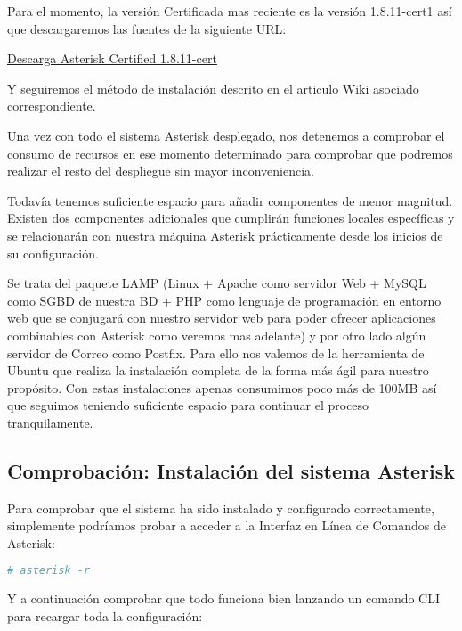Para el momento, la versión Certificada mas reciente es la versión 1.8.11-cert1 así que descargaremos las fuentes de la siguiente URL:

\href{http://downloads.asterisk.org/pub/telephony/certified-asterisk/releases/certified-asterisk-1.8.11-cert1.tar.gz}{Descarga Asterisk Certified 1.8.11-cert}

Y seguiremos el método de instalación descrito en el articulo Wiki asociado correspondiente.

Una vez con todo el sistema Asterisk desplegado, nos detenemos a comprobar el consumo de recursos en ese momento determinado para comprobar que podremos realizar el resto del despliegue sin mayor inconveniencia.


Todavía tenemos suficiente espacio para añadir componentes de menor magnitud. Existen dos componentes adicionales que cumplirán funciones locales específicas y se relacionarán con nuestra máquina Asterisk prácticamente desde los inicios de su configuración. 

Se trata del paquete LAMP (Linux + Apache como servidor Web + MySQL como SGBD de nuestra BD + PHP como lenguaje de programación en entorno web que se conjugará con nuestro servidor web para poder ofrecer aplicaciones combinables con Asterisk como veremos mas adelante) y por otro lado algún servidor de Correo como Postfix. Para ello nos valemos de la herramienta  de Ubuntu que realiza la instalación completa de la forma más ágil para nuestro propósito. Con estas instalaciones apenas consumimos poco más de 100MB así que seguimos teniendo suficiente espacio para continuar el proceso tranquilamente.

\subsection{Comprobación: Instalación del sistema Asterisk}

Para comprobar que el sistema ha sido instalado y configurado correctamente, simplemente podríamos probar a acceder a la Interfaz en Línea de Comandos de Asterisk:

\begin{lstlisting}[language=sh]
# asterisk -r
\end{lstlisting}

Y a continuación comprobar que todo funciona bien lanzando un comando CLI para recargar toda la configuración:

